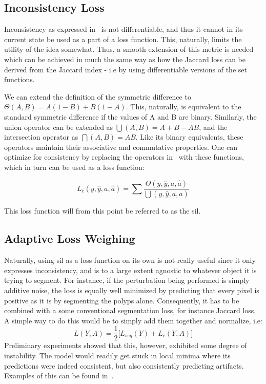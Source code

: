 \subsection{Inconsistency Loss}
Inconsistency as expressed in~ is not differentiable, and thus it cannot in its current state be used as a part of a loss function. This, naturally, limits the utility of the idea somewhat. Thus, a smooth extension of this metric is needed which can be achieved in much the same way as how the Jaccard loss can be derived from the Jaccard index - i.e by using differentiable versions of the set functions. 

We can extend the definition of the symmetric difference to \(\Theta(A,B) = A(1-B) + B(1-A)\). This, naturally, is equivalent to the standard symmetric difference if the values of A and B are binary. Similarly, the union operator can be extended as \( \bigcup(A,B) = A+B-AB\), and the intersection operator as \( \bigcap(A,B) = AB\). Like its binary equivalents, these operators maintain their associative and commutative properties. One can optimize for consistency by replacing the operators in~ with these functions, which in turn can be used as a loss function:

\begin{equation}
    L_c(y, \hat{y},  a, \hat{a}) = \sum \frac{\Theta(y, \hat{y},  a, \hat{a})}{\bigcup(y, \hat{y},  a, \hat{a})}
\end{equation}

This loss function will from this point be referred to as the \gls{sil}. 

\subsection{Adaptive Loss Weighing}
    Naturally, using \gls{sil} as a loss function on its own is not really useful since it only expresses inconsistency, and is to a large extent agnostic to whatever object it is trying to segment. For instance, if the perturbation being performed is simply additive noise, the loss is equally well minimized by predicting that every pixel is positive as it is by segmenting the polyps alone. Consequently, it has to be combined with a some conventional segmentation loss, for instance Jaccard loss. A simple way to do this would be to simply add them together and normalize, i.e:
\begin{equation*}
    L(Y, A) = \frac{1}{2} \big[L_{seg}(Y)+L_c(Y,A)\big]
\end{equation*}
Preliminary experiments showed that this, however, exhibited some degree of instability. The model would readily get stuck in local minima where its predictions were indeed consistent, but also consistently predicting artifacts. Examples of this can be found in~. 

